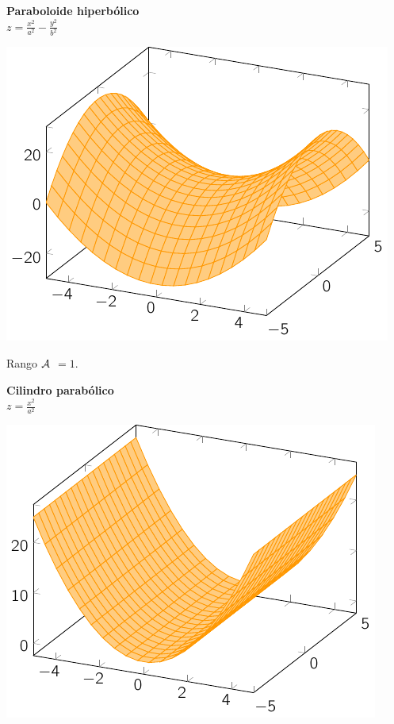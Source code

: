 \begin{minipage}[c]{0.5\textwidth}
  {\bf Paraboloide hiperbólico}\vspace{1em}\\
  $\displaystyle z = \frac{x^2}{a^2} - \frac{y^2}{b^2}$
\end{minipage}\hfill
\begin{minipage}[]{0.5\textwidth}
    \includegraphics{./img/phip.pdf}
\end{minipage}

Rango $\cal A$ $=1$.

\begin{minipage}[c]{0.45\textwidth}
  {\bf Cilindro parabólico}\vspace{1em}\\
  $\displaystyle z = \frac{x^2}{a^2}$
\end{minipage}\hfill
\begin{minipage}[]{0.45\textwidth}
\includegraphics{./img/cpar.pdf}
\end{minipage}


